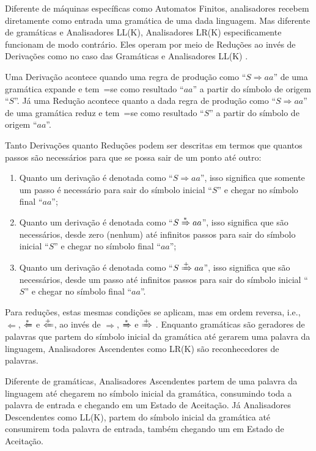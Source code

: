 Diferente de máquinas específicas como Automatos Finitos,
analisadores recebem diretamente como entrada uma gramática de uma dada linguagem.
Mas diferente de gramáticas e
Analisadores LL(K),
Analisadores LR(K) especificamente funcionam de modo contrário.
Eles operam por meio de Reduções ao invés de Derivações como no caso das Gramáticas e
Analisadores LL(K) \cite{ahoCompilerDragonBook}.

Uma Derivação acontece quando uma regra de produção como ``$S \Rightarrow a a $'' de uma gramática expande e
tem~=se como resultado ``$a a$'' a partir do símbolo de origem ``$S$''.
Já uma Redução acontece quanto a dada regra de produção como ``$S \Rightarrow a a $'' de uma gramática reduz e
tem~=se como resultado ``$S$'' a partir do símbolo de origem ``$a a$''.

Tanto Derivações quanto Reduções podem ser descritas em termos que quantos passos são necessários para que se possa sair de um ponto até outro:
\begin{enumerate}%
    \item Quanto um derivação é denotada como ``$S \Rightarrow a a $'',
    isso significa que somente um passo é necessário para sair do símbolo inicial ``$S$'' e
    chegar no símbolo final ``$a a$'';
    \item Quanto um derivação é denotada como ``$S \xRightarrow{*} a a $'',
    isso significa que são necessários,
    desde zero (nenhum) até infinitos passos para sair do símbolo inicial ``$S$'' e
    chegar no símbolo final ``$a a$'';
    \item Quanto um derivação é denotada como ``$S \xRightarrow{+} a a $'',
    isso significa que são necessários,
    desde um passo até infinitos passos para sair do símbolo inicial ``$S$'' e
    chegar no símbolo final ``$a a$''.
\end{enumerate}

Para reduções,
estas mesmas condições se aplicam,
mas em ordem reversa,
i.e., $\Leftarrow$, $\xLeftarrow{*}$ e $\xLeftarrow{+}$,
ao invés de $\Rightarrow$,
$\xRightarrow{*}$ e
$\xRightarrow{+}$ \cite{ahoCompilerDragonBook}.
Enquanto gramáticas são geradores de palavras que partem do símbolo inicial da gramática até gerarem uma palavra da linguagem,
Analisadores Ascendentes como LR(K) são reconhecedores de palavras.

Diferente de gramáticas,
Analisadores Ascendentes partem de uma palavra da linguagem até chegarem no símbolo inicial da gramática,
consumindo toda a palavra de entrada e
chegando em um Estado de Aceitação.
Já Analisadores Descendentes como LL(K),
partem do símbolo inicial da gramática até consumirem toda palavra de entrada,
também chegando um em Estado de Aceitação.

